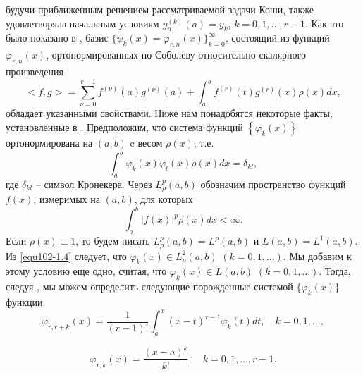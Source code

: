  будучи приближенным решением рассматриваемой задачи Коши, также удовлетворяла начальным условиям $y_n^{(k)}(a)=y_k$, $k=0,1,\ldots,r-1$. Как это было  показано в \cite{Shar20},  базис $\{\psi_k(x)= \varphi_{r,n}(x)\}_{k=0}^\infty$, состоящий из функций $\varphi_{r,n}(x)$, ортонормированных по Соболеву относительно скалярного произведения
\begin{equation}\label{equ102-1.3}
<f,g>=\sum_{\nu=0}^{r-1}f^{(\nu)}(a)g^{(\nu)}(a)+\int_{a}^{b}f^{(r)}(t)g^{(r)}(x)\rho(x)dx,
\end{equation}
 обладает указанными свойствами. Ниже нам понадобятся некоторые факты, установленные в \cite{Shar20}.  Предположим, что система функций  $\left\{\varphi_k(x)\right\}$ ортонормирована  на $(a,b)$  c весом   $\rho(x)$, т.е.
 \begin{equation}\label{equ102-1.4}
\int_a^b\varphi_k(x)\varphi_l(x)\rho(x)dx=\delta_{kl},
\end{equation}
где $\delta_{kl}$ -- символ Кронекера. Через $L^p_\rho(a,b)$ обозначим пространство  функций $f(x)$, измеримых  на  $(a,b)$, для которых
 \begin{equation*}
\int_a^b|f(x)|^p\rho(x)dx<\infty.
\end{equation*}
Если $\rho(x)\equiv1$, то будем писать $L^p_\rho(a,b)=L^p(a,b)$ и $L(a,b)=L^1(a,b)$.
Из \eqref{equ102-1.4} следует, что $\varphi_k(x)\in L^2_\rho(a,b)$ $(k=0,1,\ldots)$. Мы добавим к этому условию еще одно, считая, что $\varphi_k(x)\in L(a,b)$ $(k=0,1,\ldots)$. Тогда, следуя  \cite{Shar20}, мы можем определить следующие порожденные системой $\{\varphi_k(x)\}$ функции
 \begin{equation}\label{equ102-1.5}
\varphi_{r,r+k}(x) =\frac{1}{(r-1)!}\int_a^x(x-t)^{r-1}\varphi_{k}(t)dt, \quad k=0,1,\ldots,
\end{equation}

  \begin{equation}\label{equ102-1.6}
\varphi_{r,k}(x) =\frac{(x-a)^k}{k!}, \quad k=0,1,\ldots, r-1.
\end{equation}

